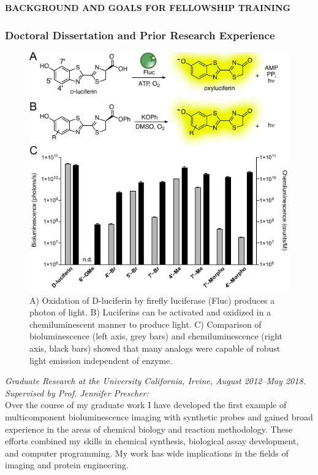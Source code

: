 \documentclass{F32}
\begin{document}
\begin{centering}
  \textbf{BACKGROUND AND GOALS FOR FELLOWSHIP TRAINING}\\
\end{centering}
\subsubsection*{Doctoral Dissertation and Prior Research Experience}
\begin{figure}
\begin{centering}
\includegraphics[width=\textwidth]{Previous_Research_figs/chemilum.pdf}

\end{centering}
\footnotesize
\caption{\label{figure:chemilum}
A) Oxidation of D-luciferin by firefly luciferase (Fluc) produces a photon of light. B) Luciferins can be activated and oxidized in a chemiluminescent manner to produce light. C) Comparison of bioluminescence (left axis, grey bars) and chemiluminescence (right axis, black bars) showed that many analogs were capable of robust light emission independent of enzyme.}
\end{figure}
\textit{Graduate Research at the University California, Irvine, August 2012--May 2018. Supervised by Prof. Jennifer Prescher:}\\
Over the course of my graduate work I have developed the first example of multicomponent bioluminescence imaging with synthetic probes and gained broad experience in the areas of chemical biology and reaction methodology. These efforts combined my skills in chemical synthesis, biological assay development, and computer programming. My work has wide implications in the fields of imaging and protein engineering.
\end{document}
